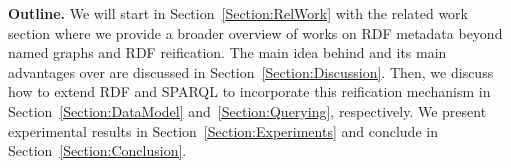 \textbf{Outline.} We will start in Section~\ref{Section:RelWork} with the related work section where we provide a broader overview of works on RDF metadata beyond named graphs and RDF reification. The main idea behind {\ReifiPlus} and its main advantages over {\Reifi} are discussed in Section~\ref{Section:Discussion}. Then, we discuss how to extend RDF and SPARQL to incorporate this reification mechanism in Section~\ref{Section:DataModel} and~\ref{Section:Querying}, respectively. We present experimental results in Section~\ref{Section:Experiments} and conclude in Section~\ref{Section:Conclusion}. 